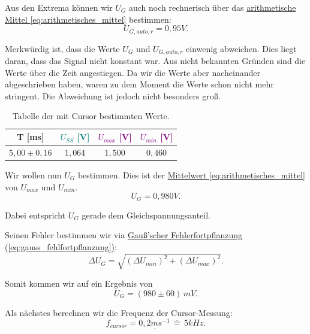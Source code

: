 Aus den Extrema können wir $U_G$ auch noch rechnerisch über das \hyperref[eq:arithmetisches_mittel]{arithmetische Mittel \ref*{eq:arithmetisches_mittel}} bestimmen:
\begin{equation}
    U_{G,auto,r} = 0,95 V.
\end{equation}

Merkwürdig ist, dass die Werte $U_G$ und $U_{G,auto,r}$ einwenig abweichen. Dies liegt daran, dass das Signal nicht konstant war. Aus nicht bekannten Gründen sind die Werte über die Zeit angestiegen. Da wir die Werte aber nacheinander abgeschrieben haben, waren zu dem Moment die Werte schon nicht mehr stringent. Die Abweichung ist jedoch nicht besonders groß.

\begin{table}[h!]
    \centering
    \begin{tabular}{c | c | c | c }
        \toprule
        T [ms] & \textcolor{teal}{$U_{SS}$ [V]} & \textcolor{purple}{$U_{max}$ [V]} & \textcolor{purple}{$U_{min}$ [V]} \\
        \hline
        $5,00 \pm 0,16 $ & $1,064$ & $1,500$ & $0,460$ \\
        \bottomrule
    \end{tabular}
    \caption{Tabelle der mit Cursor bestimmten Werte. }
    \label{tab:sig1_cursor}
\end{table}

Wir wollen nun $U_{G}$ bestimmen. Dies ist der \hyperref[eq:arithmetisches_mittel]{Mittelwert \ref*{eq:arithmetisches_mittel}} von $U_{max}$ und $U_{min}$. 
\begin{equation}
    U_{G} = 0,980 V.
\end{equation}

Dabei entspricht $U_{G}$ gerade dem Gleichspannungsanteil.

Seinen Fehler bestimmen wir via \hyperref[eq:gauss_fehlfortpflanzung]{Gauß'scher Fehlerfortpflanzung (\ref*{eq:gauss_fehlfortpflanzung})}:
\begin{equation}
    \Delta U_{G} = \sqrt{\left(\Delta U_{min}\right)^2 + \left(\Delta U_{max}\right)^2}.
\end{equation}

Somit kommen wir auf ein Ergebnis von 
\begin{equation}
    \boxed{
        U_{G} = (980 \pm 60) \, mV
    }.
\end{equation}

Als nächstes berechnen wir die Frequenz der Cursor-Messung:
\begin{equation}
    \underline{
        f_{cursor} = 0,2 ms^{-1} \, \hat= \, 5kHz
    }.
\end{equation}

